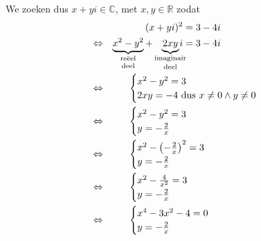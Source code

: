 \documentclass[12pt,twoside,a4]{article}
\begin{document}
We zoeken dus $x+yi \in \mathbb{C}$, met $x,y\in\mathbb{R}$ zodat
\begin{align*}
  &&(x+yi)^2 &= 3-4i\\
  \LRA &&\underbrace{x^2 - y^2}_{\text{\shortstack{reëel\\deel}}} + \underbrace{2xy}_{\text{\shortstack{imaginair\\deel}}}\hspace*{-0.3cm}i &= 3-4i\\
  \LRA && &\hspace*{-2cm}\begin{cases}x^2 - y^2 = 3\\2xy =  -4 \mbox{ dus } x\neq 0 \wedge y\neq 0 \end{cases}\\
  \LRA && &\hspace*{-2cm}\begin{cases}x^2 - y^2 = 3\\y =  -\frac{2}{x}\end{cases}\\
  \LRA && &\hspace*{-2cm}\begin{cases}x^2 - \left(-\frac{2}{x}\right)^2 = 3\\y =  -\frac{2}{x}\end{cases}\\
  \LRA && &\hspace*{-2cm}\begin{cases}x^2 - \frac{4}{x^2} = 3\\y =  -\frac{2}{x}\end{cases}\\
  \LRA && &\hspace*{-2cm}\begin{cases}x^4-3x^2-4=0\\y =  -\frac{2}{x}\end{cases}
\end{align*}
\end{document}
